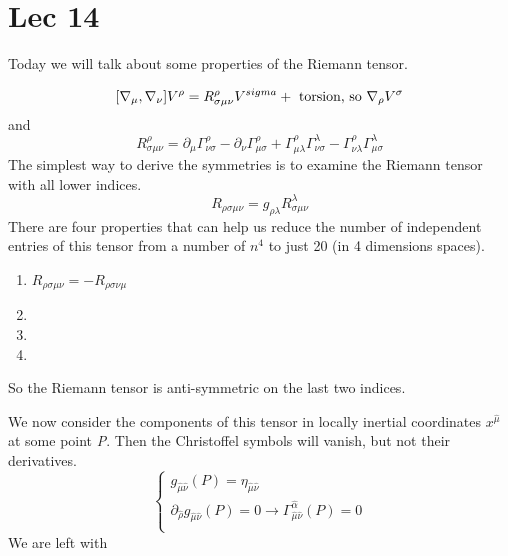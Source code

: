 \section{Lec 14}
Today we will talk about some properties of the Riemann tensor.\par
\[
	[\nabla _{\mu }, \nabla _{\nu }] V^{\rho } = R^{\rho }_{\sigma \mu \nu } V^{\\sigma } + \text{ torsion, so } \nabla _{\rho }V^{\sigma }
\]
and 
\[
	R^{\rho }_{\sigma \mu \nu } = \partial_{\mu }\Gamma^{\rho }_{\nu \sigma } - \partial_{\nu }\Gamma ^{\rho }_{\mu \sigma } + \Gamma  ^{\rho }_{\mu \lambda } \Gamma ^{\lambda }_{\nu \sigma } -\Gamma ^{\rho }_{\nu \lambda }\Gamma ^{\lambda }_{\mu \sigma }
\]
The simplest way to derive the symmetries is to examine the Riemann tensor with all lower indices.
\[
R_{\rho \sigma \mu \nu } = g_{\rho \lambda } R^{\lambda }_{\sigma \mu \nu }
\]
There are four properties that can help us reduce the number of independent entries of this tensor from a number of $n^{4}$ to just 20 (in 4 dimensions spaces).
\begin{enumerate}
\item $R_{\rho \sigma \mu \nu } = - R_{\rho \sigma \nu \mu } $ 
	\item 
	\item 
	\item
\end{enumerate}
So the Riemann tensor is anti-symmetric on the last two indices.\par
We now consider the components of this tensor in locally inertial coordinates $x^{\hat{\mu }}$ at some point \emph{P}. Then the Christoffel symbols will vanish, but not their derivatives.
\begin{equation}
\begin{cases}
g_{\hat{\mu }\hat{\nu }} \left( P \right) = \eta _{\hat{\mu }\hat{\nu }} \\
\partial_{\hat{\rho }} g_{\hat{\mu }\hat{\nu }}\left( P \right) = 0 \to \Gamma ^{\hat{\alpha }}_{\hat{\mu }\hat{\nu }} \left( P \right) = 0 \\
\end{cases}
\end{equation}
We are left with
